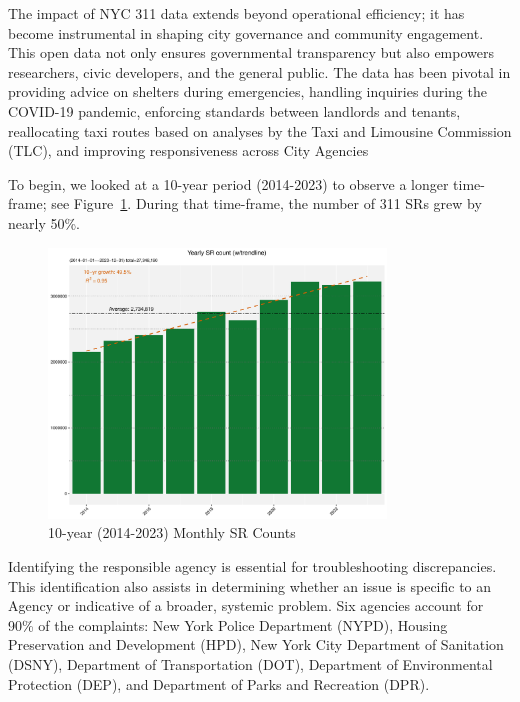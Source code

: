 \documentclass[12pt, titlepage]{article}
\begin{document}

The impact of NYC 311 data extends beyond operational efficiency; it
has become instrumental in shaping city governance and community
engagement. This open data not only ensures governmental transparency
but also empowers researchers, civic developers, and the general
public. The data has been pivotal in providing advice on shelters
during emergencies, handling inquiries during the COVID-19 pandemic,
enforcing standards between landlords and tenants, reallocating taxi
routes based on analyses by the Taxi and Limousine Commission (TLC),
and improving responsiveness across City Agencies

To begin, we looked at a 10-year period (2014-2023) to
observe a longer time-frame; see
Figure~\ref{fig:10-yr-monthly}. During that time-frame,
the number of 311 SRs grew by nearly 50\%.


\begin{figure}[tbp]
	\centering
  	\includegraphics[width=0.8\textwidth]{10-year-trend_yearly.pdf}
 	\caption{10-year (2014-2023) Monthly SR Counts}
  	\label{fig:10-yr-monthly}
\end{figure}



Identifying the responsible agency is essential 
for troubleshooting discrepancies. This identification also assists in 
determining whether an issue is specific to an Agency or indicative 
of a broader, systemic problem. Six agencies account for 90\% of 
the complaints: New York Police Department (NYPD), 
Housing Preservation and Development (HPD),
New York City Department of Sanitation (DSNY), Department of
Transportation (DOT), Department of Environmental Protection (DEP),
and Department of Parks and Recreation (DPR).
\end{document}
